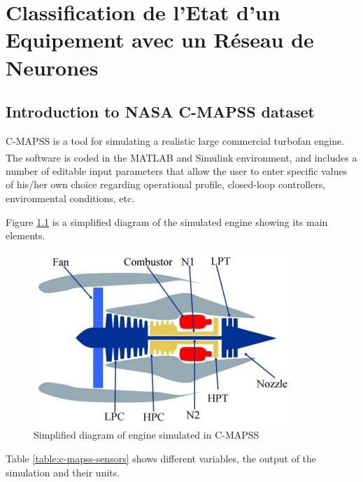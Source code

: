 \chapter{Classification de l'Etat d'un Equipement avec un Réseau de Neurones}



\section{Introduction to NASA C-MAPSS dataset}
C-MAPSS is a tool for simulating a realistic large commercial turbofan engine. The software is coded in the MATLAB\textsuperscript{\textregistered} and Simulink\textsuperscript{\textregistered} environment, and includes a number of editable input parameters that allow the user to enter specific values of his/her own choice regarding operational profile, closed-loop controllers, environmental conditions, etc. \cite{Saxena2008}

Figure \ref{figure:c-mapss-engine-diagram} is a simplified diagram of the simulated engine showing its main elements.
\begin{figure}[H]
    \centering
    \includegraphics[width=.5\linewidth]{figures/c-mapss-engine-diagram.jpg}
    \caption{Simplified diagram of engine simulated in C-MAPSS \cite{Saxena2008}}
    \label{figure:c-mapss-engine-diagram}
\end{figure}

Table \ref{table:c-mapss-sensors} shows different variables, the output of the simulation and their units.

